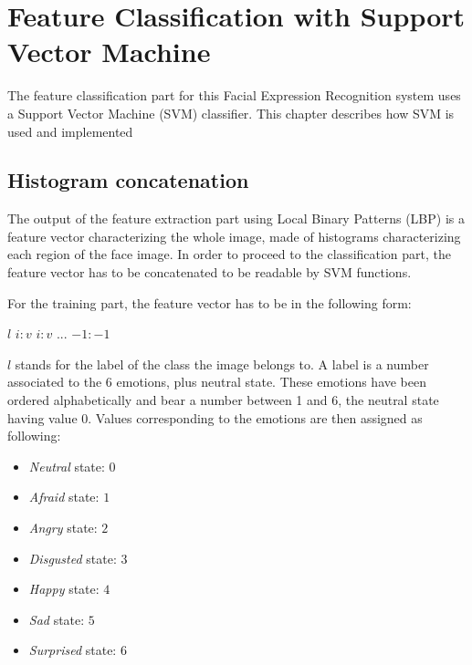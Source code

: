 \chapter{Feature Classification with Support Vector Machine}
\label{chap:implementation_svm}

\noindent The feature classification part for this Facial Expression Recognition system uses a Support Vector Machine (SVM) classifier. This chapter describes how SVM is used and implemented
\newline

\section{Histogram concatenation}

\vspace{\baselineskip}
\noindent The output of the feature extraction part using Local Binary Patterns (LBP) is a feature vector characterizing the whole image, made of histograms characterizing each region of the face image. In order to proceed to the classification part, the feature vector has to be concatenated to be readable by SVM functions.
\newline

\noindent For the training part, the feature vector has to be in the following form:
\begin{center}
\noindent $ l $ \hspace{0.7cm} $ i:v $ \hspace{0.2cm} $ i:v $ \hspace{0.2cm} $ ... $ \hspace{0.2cm} $ -1:-1 $
\end{center} 
\noindent $ l $ stands for the label of the class the image belongs to. A label is a number associated to the 6 emotions, plus neutral state. These emotions have been ordered alphabetically and bear a number between 1 and 6, the neutral state having value 0. Values corresponding to the emotions are then assigned as following:

\begin{itemize}
	\item \textit{Neutral} state: $ 0 $
	\item \textit{Afraid} state: $ 1 $
	\item \textit{Angry} state: $ 2 $
	\item \textit{Disgusted} state: $ 3 $
	\item \textit{Happy} state: $ 4 $
	\item \textit{Sad} state: $ 5 $
	\item \textit{Surprised} state: $ 6 $
\end{itemize}


